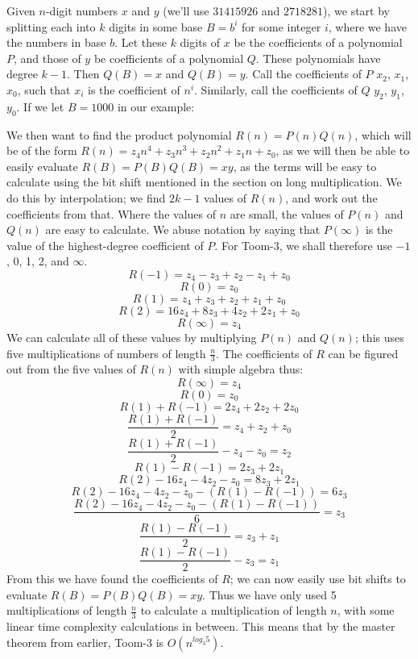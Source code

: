 \documentclass[12pt,a4paper]{report}
\begin{document}
\begin{multicols}{2}
Given \(n\)-digit numbers \(x\) and \(y\) (we'll use \(31415926\) and \(2718281\)), we start by splitting each into \(k\) digits in some base \(B=b^i\) for some integer \(i\), where we have the numbers in base \(b\).
Let these \(k\) digits of \(x\) be the coefficients of a polynomial \(P\), and those of \(y\) be coefficients of a polynomial \(Q\). These polynomials have degree \(k-1\). Then \(Q(B)=x\) and \(Q(B)=y\). Call the coefficients of \(P\) \(x_2\), \(x_1\), \(x_0\), such that \(x_i\) is the coefficient of \(n^i\). Similarly, call the coefficients of \(Q\) \(y_2\), \(y_1\), \(y_0\). If we let \(B=1000\) in our example:



We then want to find the product polynomial \(R(n)=P(n)Q(n)\), which will be of the form \(R(n)=z_4n^4+z_3n^3+z_2n^2+z_1n+z_0\), as we will then be able to easily evaluate \(R(B)=P(B)Q(B)=xy\), as the terms will be easy to calculate using the bit shift mentioned in the section on long multiplication. We do this by interpolation; we find \(2k-1\) values of \(R(n)\), and work out the coefficients from that. Where the values of \(n\) are small, the values of \(P(n)\) and \(Q(n)\) are easy to calculate. We abuse notation by saying that \(P(\infty)\) is the value of the highest-degree coefficient of \(P\). For Toom-3, we shall therefore use \(-1\), 0, 1, 2, and \(\infty\).
\[R(-1)=z_4-z_3+z_2-z_1+z_0\]
\[R(0)=z_0\]
\[R(1)=z_4+z_3+z_2+z_1+z_0\]
\[R(2)=16z_4+8z_3+4z_2+2z_1+z_0\]
\[R(\infty)=z_4\]
We can calculate all of these values by multiplying \(P(n)\) and \(Q(n)\); this uses five multiplications of numbers of length \(\frac{n}{3}\). The coefficients of \(R\) can be figured out from the five values of \(R(n)\) with simple algebra thus:
\[R(\infty)=z_4\]
\[R(0)=z_0\]
\[R(1)+R(-1)=2z_4+2z_2+2z_0\]
\[\frac{R(1)+R(-1)}{2}=z_4+z_2+z_0\]
\[\frac{R(1)+R(-1)}{2}-z_4-z_0=z_2\]
\[R(1)-R(-1)=2z_3+2z_1\]
\[R(2)-16z_4-4z_2-z_0=8z_3+2z_1\]
\[R(2)-16z_4-4z_2-z_0-(R(1)-R(-1))=6z_3\]
\[\frac{R(2)-16z_4-4z_2-z_0-(R(1)-R(-1))}{6}=z_3\]
\[\frac{R(1)-R(-1)}{2}=z_3+z_1\]
\[\frac{R(1)-R(-1)}{2}-z_3=z_1\]
From this we have found the coefficients of \(R\); we can now easily use bit shifts to evaluate \(R(B)=P(B)Q(B)=xy\). Thus we have only used 5 multiplications of length \(\frac{n}{3}\) to calculate a multiplication of length \(n\), with some linear time complexity calculations in between. This means that by the master theorem from earlier, Toom-3 is \(O(n^{log_{3}5})\).

\end{multicols}
\end{document}
